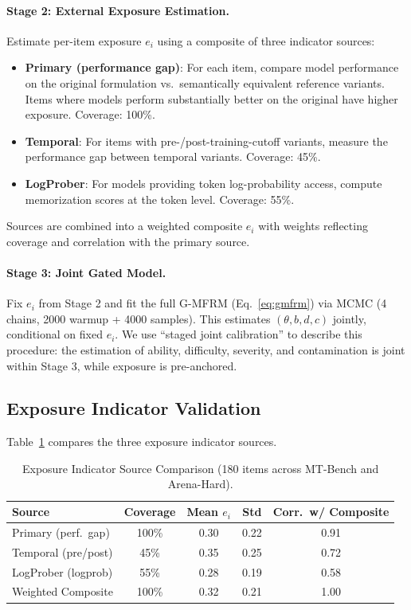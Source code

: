 \documentclass[11pt]{article}
\newcommand{\ei}{e_i}
\begin{document}
\paragraph{Stage 2: External Exposure Estimation.}
Estimate per-item exposure $\ei$ using a composite of three indicator sources:
\begin{itemize}
    \item \textbf{Primary (performance gap)}: For each item, compare model performance on the original formulation vs.\ semantically equivalent reference variants. Items where models perform substantially better on the original have higher exposure. Coverage: 100\%.
    \item \textbf{Temporal}: For items with pre-/post-training-cutoff variants, measure the performance gap between temporal variants. Coverage: 45\%.
    \item \textbf{LogProber}: For models providing token log-probability access, compute memorization scores at the token level. Coverage: 55\%.
\end{itemize}

Sources are combined into a weighted composite $\ei$ with weights reflecting coverage and correlation with the primary source.

\paragraph{Stage 3: Joint Gated Model.}
Fix $\ei$ from Stage 2 and fit the full G-MFRM (Eq.~\ref{eq:gmfrm}) via MCMC (4 chains, 2000 warmup + 4000 samples).
This estimates $(\theta, b, d, c)$ jointly, conditional on fixed $\ei$.
We use ``staged joint calibration'' to describe this procedure: the estimation of ability, difficulty, severity, and contamination is joint within Stage 3, while exposure is pre-anchored.

\subsection{Exposure Indicator Validation}

Table~\ref{tab:exposure_sources} compares the three exposure indicator sources.

\begin{table}[t]
\centering
\caption{Exposure Indicator Source Comparison (180 items across MT-Bench and Arena-Hard).}
\label{tab:exposure_sources}
\begin{tabular}{lcccc}
\toprule
Source & Coverage & Mean $\ei$ & Std & Corr.\ w/ Composite \\
\midrule
Primary (perf.\ gap) & 100\% & 0.30 & 0.22 & 0.91 \\
Temporal (pre/post) & 45\% & 0.35 & 0.25 & 0.72 \\
LogProber (logprob) & 55\% & 0.28 & 0.19 & 0.58 \\
Weighted Composite & 100\% & 0.32 & 0.21 & 1.00 \\
\bottomrule
\end{tabular}
\end{table}
\end{document}
